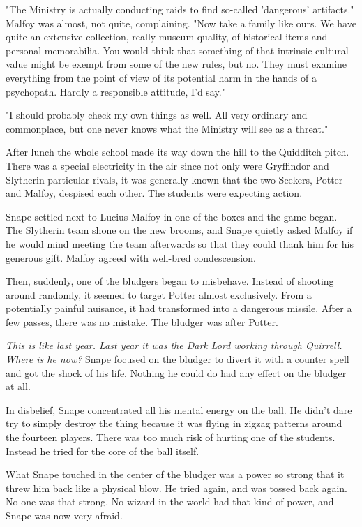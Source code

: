 \documentclass[a4paper,11pt]{article}
\begin{document}
"The Ministry is actually conducting raids to find so-called 'dangerous' artifacts." Malfoy was almost, not quite, complaining. "Now take a family like ours. We have quite an extensive collection, really museum quality, of historical items and personal memorabilia. You would think that something of that intrinsic cultural value might be exempt from some of the new rules, but no. They must examine everything from the point of view of its potential harm in the hands of a psychopath. Hardly a responsible attitude, I'd say."

"I should probably check my own things as well. All very ordinary and commonplace, but one never knows what the Ministry will see as a threat."

After lunch the whole school made its way down the hill to the Quidditch pitch. There was a special electricity in the air since not only were Gryffindor and Slytherin particular rivals, it was generally known that the two Seekers, Potter and Malfoy, despised each other. The students were expecting action.

Snape settled next to Lucius Malfoy in one of the boxes and the game began. The Slytherin team shone on the new brooms, and Snape quietly asked Malfoy if he would mind meeting the team afterwards so that they could thank him for his generous gift. Malfoy agreed with well-bred condescension.

Then, suddenly, one of the bludgers began to misbehave. Instead of shooting around randomly, it seemed to target Potter almost exclusively. From a potentially painful nuisance, it had transformed into a dangerous missile. After a few passes, there was no mistake. The bludger was after Potter.

\emph{This is like last year. Last year it was the Dark Lord working through Quirrell. Where is he now?} Snape focused on the bludger to divert it with a counter spell and got the shock of his life. Nothing he could do had any effect on the bludger at all.

In disbelief, Snape concentrated all his mental energy on the ball. He didn't dare try to simply destroy the thing because it was flying in zigzag patterns around the fourteen players. There was too much risk of hurting one of the students. Instead he tried for the core of the ball itself.

What Snape touched in the center of the bludger was a power so strong that it threw him back like a physical blow. He tried again, and was tossed back again. No one was that strong. No wizard in the world had that kind of power, and Snape was now very afraid.
\end{document}
